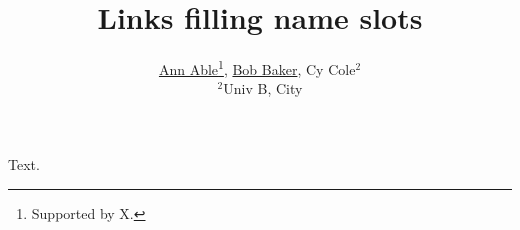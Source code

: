 \documentclass{article}
\begin{document}
\title{Links filling name slots}
\author{\href{http://ann.org}{Ann Able}\thanks{Supported by X.}, \href{http://bob.org/home}{Bob Baker}, Cy Cole$^{2}$\\
$^{2}$Univ B, City}
\maketitle
Text.
\end{document}
